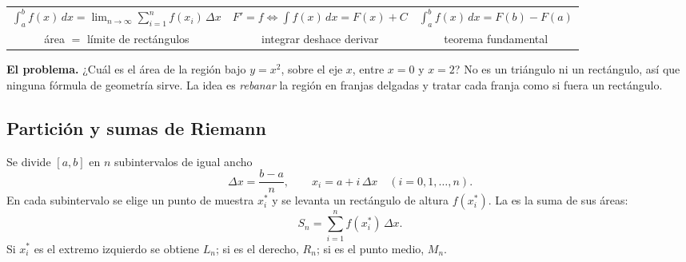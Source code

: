 \documentclass[11pt,a4paper]{article}
\newcommand{\dx}{\,dx}
\begin{document}

\begin{clavebox}
\renewcommand{\arraystretch}{1.6}\begin{tabular}{@{}c@{\quad}c@{\quad}c@{}}
$\displaystyle\int_a^b f(x)\dx=\lim_{n\to\infty}\sum_{i=1}^{n}f(x_i)\,\Delta x$ &
$\displaystyle F'=f\iff\int f(x)\dx=F(x)+C$ &
$\displaystyle\int_a^b f(x)\dx=F(b)-F(a)$\\
\small área $=$ límite de rectángulos & \small integrar deshace derivar & \small teorema fundamental
\end{tabular}
\end{clavebox}


\textbf{El problema.} ¿Cuál es el área de la región bajo $y=x^{2}$, sobre el eje $x$, entre $x=0$ y $x=2$? No es un
triángulo ni un rectángulo, así que ninguna fórmula de geometría sirve. La idea es \emph{rebanar} la región en franjas
delgadas y tratar cada franja como si fuera un rectángulo.

\subsection{Partición y sumas de Riemann}
\begin{definicion}
Se divide $[a,b]$ en $n$ subintervalos de igual ancho
\[ \Delta x=\frac{b-a}{n},\qquad x_i=a+i\,\Delta x\quad(i=0,1,\dots,n). \]
En cada subintervalo se elige un punto de muestra $x_i^{*}$ y se levanta un rectángulo de altura $f(x_i^{*})$.
La  es la suma de sus áreas:
\[ S_n=\sum_{i=1}^{n}f(x_i^{*})\,\Delta x. \]
Si $x_i^{*}$ es el extremo izquierdo se obtiene $L_n$; si es el derecho, $R_n$; si es el punto medio, $M_n$.
\end{definicion}
\end{document}

